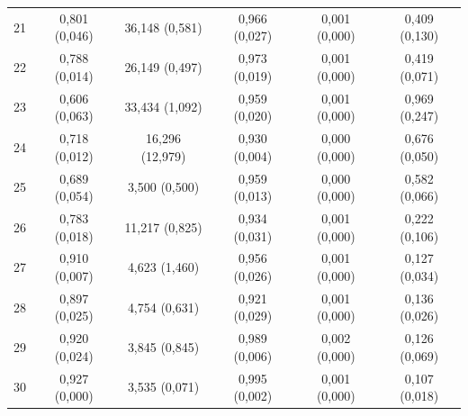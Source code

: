 \begin{tabular}{l c c c c c}
21 & 0,801 (0,046) & 36,148 (0,581) & 0,966 (0,027) & 0,001 (0,000) & 0,409 (0,130) \\
22 & 0,788 (0,014) & 26,149 (0,497) & 0,973 (0,019) & 0,001 (0,000) & 0,419 (0,071) \\
23 & 0,606 (0,063) & 33,434 (1,092) & 0,959 (0,020) & 0,001 (0,000) & 0,969 (0,247) \\
24 & 0,718 (0,012) & 16,296 (12,979) & 0,930 (0,004) & 0,000 (0,000) & 0,676 (0,050) \\
25 & 0,689 (0,054) & 3,500 (0,500) & 0,959 (0,013) & 0,000 (0,000) & 0,582 (0,066) \\
26 & 0,783 (0,018) & 11,217 (0,825) & 0,934 (0,031) & 0,001 (0,000) & 0,222 (0,106) \\
27 & 0,910 (0,007) & 4,623 (1,460) & 0,956 (0,026) & 0,001 (0,000) & 0,127 (0,034) \\
28 & 0,897 (0,025) & 4,754 (0,631) & 0,921 (0,029) & 0,001 (0,000) & 0,136 (0,026) \\
29 & 0,920 (0,024) & 3,845 (0,845) & 0,989 (0,006) & 0,002 (0,000) & 0,126 (0,069) \\
30 & 0,927 (0,000) & 3,535 (0,071) & 0,995 (0,002) & 0,001 (0,000) & 0,107 (0,018) \\
\hline 
 \end{tabular}
